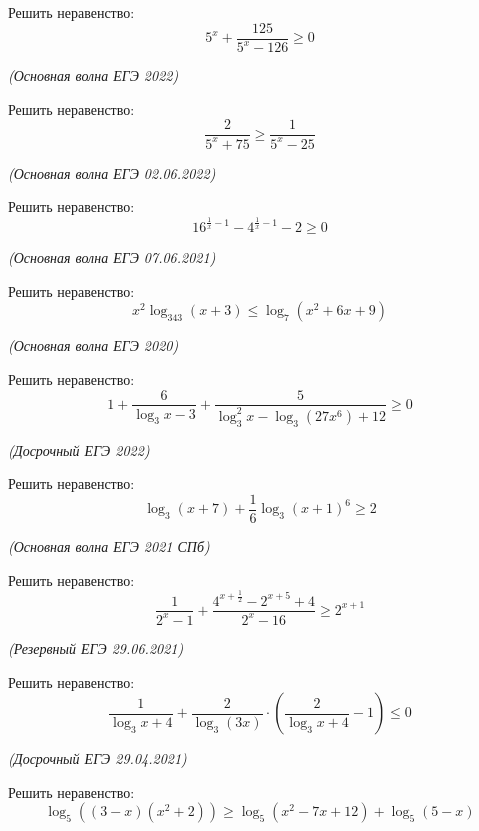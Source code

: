 \begin{class}[number=3]
	\begin{listofex}
		\item Решить неравенство: 
		\[ 5^x+\dfrac{125}{5^x-126}\ge0 \]
		\begin{flushright}
			\textit{(Основная волна ЕГЭ 2022)}
		\end{flushright}
		\item Решить неравенство:
		\[ \dfrac{2}{5^x+75}\ge\dfrac{1}{5^x-25} \]
		\begin{flushright}
			\textit{(Основная волна ЕГЭ 02.06.2022)}
		\end{flushright}
		\item Решить неравенство:
		\[ 16^{\tfrac{1}{x}-1}-4^{\tfrac{1}{x}-1}-2\ge0 \]
		\begin{flushright}
			\textit{(Основная волна ЕГЭ 07.06.2021)}
		\end{flushright}
		\item Решить неравенство:
		\[ x^2\log_{343}(x+3)\le\log_7(x^2+6x+9) \]
		\begin{flushright}
			\textit{(Основная волна ЕГЭ 2020)}
		\end{flushright}
		\item Решить неравенство:
		\[ 1+\dfrac{6}{\log_3x-3}+\dfrac{5}{\log^2_3x-\log_3(27x^6)+12}\ge0 \]
		\begin{flushright}
			\textit{(Досрочный ЕГЭ 2022)}
		\end{flushright}
		\item Решить неравенство:
		\[ \log_3(x+7)+\dfrac{1}{6}\log_3(x+1)^6\ge2 \]
		\begin{flushright}
			\textit{(Основная волна ЕГЭ 2021 СПб)}
		\end{flushright}
		\item Решить неравенство:
		\[ \dfrac{1}{2^x-1}+\dfrac{4^{x+\tfrac{1}{2}}-2^{x+5}+4}{2^x-16}\ge2^{x+1} \]
		\begin{flushright}
			\textit{(Резервный ЕГЭ 29.06.2021)}
		\end{flushright}
		\item Решить неравенство:
		\[ \dfrac{1}{\log_3x+4}+\dfrac{2}{\log_3(3x)}\cdot\left( \dfrac{2}{\log_3x+4}-1 \right)\le0 \]
		\begin{flushright}
			\textit{(Досрочный ЕГЭ 29.04.2021)}
		\end{flushright}
		\item Решить неравенство:
		\[ \log_5\left( (3-x)(x^2+2) \right)\ge\log_5(x^2-7x+12)+\log_5(5-x) \]

\end{listofex}
\end{class}
